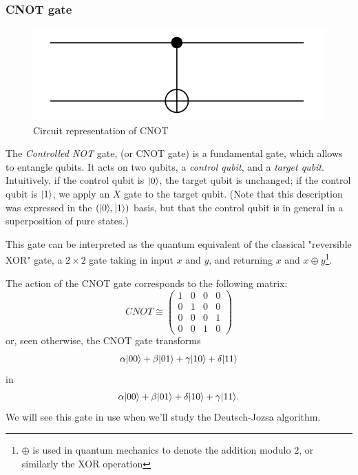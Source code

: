 \documentclass[12pt,a4paper]{article}
\theoremstyle{plain}
\theoremstyle{definition}
\DeclarePairedDelimiter\ket{\lvert}{\rangle}
\begin{document}
\subsubsection{CNOT gate}
\begin{figure}
    \centering
    \includegraphics*[scale=0.5]{cnot.png}
    \caption{Circuit representation of CNOT}
\end{figure}
The \emph{Controlled NOT} gate, (or CNOT gate) is a fundamental gate, which allows to entangle qubits. It acts on two qubits, a \emph{control qubit}, and a \emph{target qubit}. Intuitively, if the control qubit is $\ket{0}$, the target qubit is unchanged; if the control qubit is $\ket{1}$, we apply an $X$ gate to the target qubit. (Note that this description was expressed in the $(\ket{0}, \ket{1})$ basis, but that the control qubit is in general in a superposition of pure states.) 

This gate can be interpreted as the quantum equivalent of the classical "reversible XOR" gate, a $2\times 2$ gate taking in input $x$ and $y$, and returning $x$ and $x\oplus y$\footnote{$\oplus$ is used in quantum mechanics to denote the addition modulo 2, or similarly the XOR operation}.

The action of the CNOT gate corresponds to the following matrix:
\begin{equation*}
    CNOT \cong \begin{pmatrix}
        1&0&0&0\\
        0&1&0&0\\
        0&0&0&1\\
        0&0&1&0
    \end{pmatrix}
\end{equation*}
or, seen otherwise, the CNOT gate transforms
\begin{equation*}
    \alpha\ket{00}+\beta\ket{01}+\gamma\ket{10}+\delta\ket{11}
\end{equation*}
in
\begin{equation*}
    \alpha\ket{00}+\beta\ket{01}+\delta\ket{10}+\gamma\ket{11}.
\end{equation*}
We will see this gate in use when we'll study the Deutsch-Jozsa algorithm.
\end{document}
